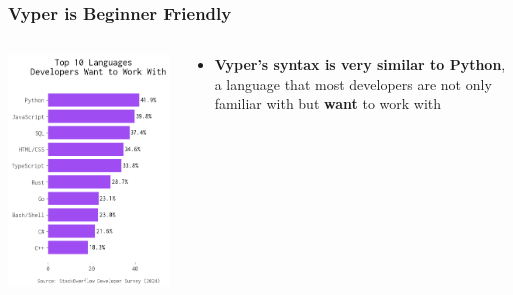 \documentclass[aspectratio=169]{beamer}
\begin{document}
\begin{frame}
	\frametitle{Vyper is Beginner Friendly}
	\begin{columns}[T,totalwidth=\textwidth]
		\begin{column}{0.35\textwidth}
			\vspace{2em} %
			\includegraphics[width=\columnwidth,height=0.75\paperheight,keepaspectratio]{charts/favoritelanguage.png}
		\end{column}
		\begin{column}{0.65\textwidth}
			\vspace{2em} %
			\begin{itemize}
				\item \textbf{Vyper's syntax is very similar to Python}, a language that most developers are not only familiar with but \textbf{want} to work with\\
			\end{itemize}
			

\end{column}
\end{columns}
\end{frame}
\end{document}
